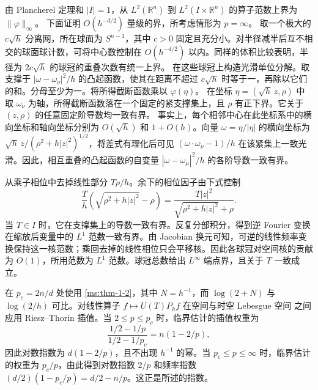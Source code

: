 由 Plancherel 定理和 \(|I|=1\)，从 \(L^2(\mathbb R^n)\) 到 \(L^2(I\times\mathbb R^n)\) 的算子范数上界为 \(\|\varphi\|_\infty\)。
下面证明 \(O(h^{-d/2})\) 量级的界，所考虑情形为 \(p=\infty\)。
取一个极大的 \(c\sqrt h\) 分离网，所在球面为 \(S^{n-1}\)，其中 \(c>0\) 固定且充分小。对半径减半后互不相交的球面球计数，可将中心数控制在 \(O(h^{-d/2})\) 以内。同样的体积比较表明，半径为 \(2c\sqrt h\) 的球冠的重叠次数有统一上界。
在这些球冠上构造光滑单位分解。取支撑于 \(|\omega-\omega_\nu|^2/h\) 的凸起函数，使其在距离不超过 \(c\sqrt h\) 时等于一，再除以它们的和。分母至少为一。将所得截断函数乘以 \(\varphi(\eta)\)。
在坐标 \(\eta=(\sqrt h\,z,\rho)\) 中取 \(\omega_\nu\) 为轴，所得截断函数落在一个固定的紧支撑集上，且 \(\rho\) 有正下界。它关于 \((z,\rho)\) 的任意固定阶导数均一致有界。
事实上，每个相邻中心在此坐标系中的横向坐标和轴向坐标分别为 \(O(\sqrt h)\) 和 \(1+O(h)\)。向量 \(\omega=\eta/|\eta|\) 的横向坐标为 \(\sqrt h\,z/(\rho^2+h|z|^2)^{1/2}\)，将差式有理化后可见 \((\omega\cdot\omega_\nu-1)/h\) 在该紧集上一致光滑。因此，相互重叠的凸起函数的自变量 \(|\omega-\omega_\mu|^2/h\) 的各阶导数一致有界。

从乘子相位中去掉线性部分 \(T\rho/h\)。余下的相位因子由下式控制
\[
 \frac{T}{h}(\sqrt{\rho^2+h|z|^2}-\rho)
 =\frac{T|z|^2}{\sqrt{\rho^2+h|z|^2}+\rho}.
\]
当 \(T\in I\) 时，它在支撑集上的导数一致有界。反复分部积分，得到逆 Fourier 变换在缩放后变量中的 \(L^1\) 范数一致有界。由 Jacobian 换元可知，可逆的线性频率变换保持这一核范数；乘回去掉的线性相位只会平移核。因此各球冠对空间核的贡献为 \(O(1)\)，所用范数为 \(L^1\) 范数。球冠总数给出 \(L^\infty\) 端点界，且关于 \(T\) 一致成立。

在 \(p_c=2n/d\) 处使用 \ref{ms:thm-1-2}，其中 \(N=h^{-1}\)，而 \(\log(2+N)\) 与 \(\log(2/h)\) 可比。对线性算子 \(f\mapsto U(T)P_h f\) 在空间与时空 Lebesgue 空间 \cite{r-32} 之间应用 Riesz--Thorin 插值。当 \(2\le p\le p_c\) 时，临界估计的插值权重为
\[
 \frac{1/2-1/p}{1/2-1/p_c}=n(1-2/p),
\]
因此对数指数为 \(d(1-2/p)\)，且不出现 \(h^{-1}\) 的幂。当 \(p_c\le p\le\infty\) 时，临界估计的权重为 \(p_c/p\)，由此得到对数指数 \(2/p\) 和频率指数 \((d/2)(1-p_c/p)=d/2-n/p\)。这正是所述的指数。

